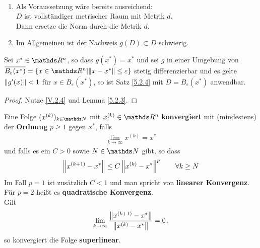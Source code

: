 \begin{Beme}
	\label{5.2.5}~
	\begin{enumerate}[1)]
		\item Als Voraussetzung wäre bereits ausreichend:\\
		$D$ ist vollständiger metrischer Raum mit Metrik $d$. \\
		Dann ersetze die Norm durch die Metrik $d$.
		\item Im Allgemeinen ist der Nachweis $g(D)\subset D$ schwierig.
	\end{enumerate}
\end{Beme}



\begin{Fole}
	\label{5.2.6}
	Sei $x^{*}\in \R^n$, so dass $g(x^{*})=x^{*}$ und sei $g$ in einer Umgebung von 
	$\overline{B_\varepsilon(x^{*})}=\left\{ x\in \R^n \middle\vert \nn{x-x^{*}}\leq \varepsilon \right\}$
	stetig differenzierbar und es gelte $\left\| g'(x) \right\|<1$ für $x\in \overline{B_\varepsilon(x^{*})}$,
	so ist Satz \ref{5.2.4} mit $D=\overline{B_\varepsilon(x^{*})}$ anwendbar.
\end{Fole}

\begin{proof}
	Nutze \eqref{V.2.4} und Lemma \ref{5.2.3}.
\end{proof}


\begin{Defe}
	\label{5.3.1}
	Eine Folge $(x^{(k)})_{k\in\N} $ mit $x^{(k)}\in\R^n$ \textbf{konvergiert} mit (mindestens)
	der \textbf{Ordnung} $p\geq 1$ gegen $x^{*}$, falls
	\begin{gather*}
	\lim\limits_{k\rightarrow \infty}x^{(k)}=x^{*}
	\end{gather*}
	und falls es ein $C>0$ sowie $N\in\N$ gibt, so dass
	\begin{gather*}
	\left\| x^{(k+1)}-x^{*} \right\| \leq C \left\| x^{(k)}-x^{*} \right\|^p\qquad \forall k\geq N 
	\end{gather*}
	Im Fall $p=1$ ist zusätzlich $C<1$ und man spricht von \textbf{linearer Konvergenz}. \\
	Für $p=2$ heißt es \textbf{quadratische Konvergenz}.
	\\Gilt 
	\begin{gather*} 
	\lim\limits_{k\rightarrow \infty}\frac{\left\| x^{(k+1)}-x^{*} \right\|}{\left\| x^{(k)}-x^{*} \right\|} = 0\, ,
	\end{gather*} so konvergiert die Folge \textbf{superlinear}.
\end{Defe}


